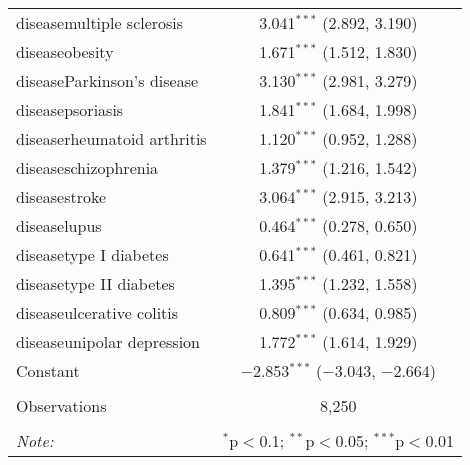 \begin{table}[!htbp]
\begin{tabular}{@{\extracolsep{5pt}}lc}
  diseasemultiple sclerosis & 3.041$^{***}$ (2.892, 3.190) \\ 
  diseaseobesity & 1.671$^{***}$ (1.512, 1.830) \\ 
  diseaseParkinson's disease & 3.130$^{***}$ (2.981, 3.279) \\ 
  diseasepsoriasis & 1.841$^{***}$ (1.684, 1.998) \\ 
  diseaserheumatoid arthritis & 1.120$^{***}$ (0.952, 1.288) \\ 
  diseaseschizophrenia & 1.379$^{***}$ (1.216, 1.542) \\ 
  diseasestroke & 3.064$^{***}$ (2.915, 3.213) \\ 
  diseaselupus & 0.464$^{***}$ (0.278, 0.650) \\ 
  diseasetype I diabetes & 0.641$^{***}$ (0.461, 0.821) \\ 
  diseasetype II diabetes & 1.395$^{***}$ (1.232, 1.558) \\ 
  diseaseulcerative colitis & 0.809$^{***}$ (0.634, 0.985) \\ 
  diseaseunipolar depression & 1.772$^{***}$ (1.614, 1.929) \\ 
  Constant & $-$2.853$^{***}$ ($-$3.043, $-$2.664) \\ 
 \hline \\[-1.8ex] 
Observations & 8,250 \\ 
\hline 
\hline \\[-1.8ex] 
\textit{Note:}  & \multicolumn{1}{r}{$^{*}$p$<$0.1; $^{**}$p$<$0.05; $^{***}$p$<$0.01} \\ 
\end{tabular} 
\end{table} 
